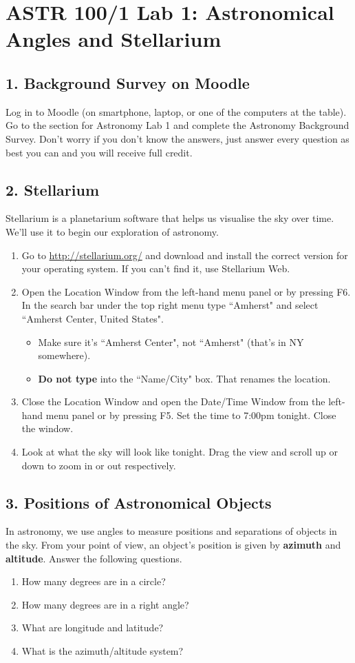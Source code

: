 \documentclass[main.tex]{subfiles}
\begin{document}
\section*{ASTR 100/1 Lab 1: Astronomical Angles and Stellarium}

\subsection*{1. Background Survey on Moodle}
Log in to Moodle (on smartphone, laptop, or one of the computers at the table). Go to the section for Astronomy Lab 1 and complete the Astronomy Background Survey. Don't worry if you don't know the answers, just answer every question as best you can and you will receive full credit.

\subsection*{2. Stellarium}
Stellarium is a planetarium software that helps us visualise the sky over time. We'll use it to begin our exploration of astronomy.
\begin{enumerate}
\item Go to \url{http://stellarium.org/} and download and install the correct version for your operating system. If you can't find it, use Stellarium Web.
\item Open the Location Window from the left-hand menu panel or by pressing F6. In the search bar under the top right menu type ``Amherst" and select ``Amherst Center, United States".
	\begin{itemize}
	\item Make sure it's ``Amherst Center", not ``Amherst" (that's in NY somewhere).
	\item \textbf{Do not type} into the ``Name/City" box. That renames the location.
	\end{itemize}
\item Close the Location Window and open the Date/Time Window from the left-hand menu panel or by pressing F5. Set the time to 7:00pm tonight. Close the window.
\item Look at what the sky will look like tonight. Drag the view and scroll up or down to zoom in or out respectively.
\end{enumerate}

\subsection*{3. Positions of Astronomical Objects}
In astronomy, we use angles to measure positions and separations of objects in the sky. From your point of view, an object's position is given by \textbf{azimuth} and \textbf{altitude}. Answer the following questions.
\begin{enumerate}
\item How many degrees are in a circle?
\item How many degrees are in a right angle?
\item What are longitude and latitude?
\item What is the azimuth/altitude system?
\end{enumerate}
\end{document}
